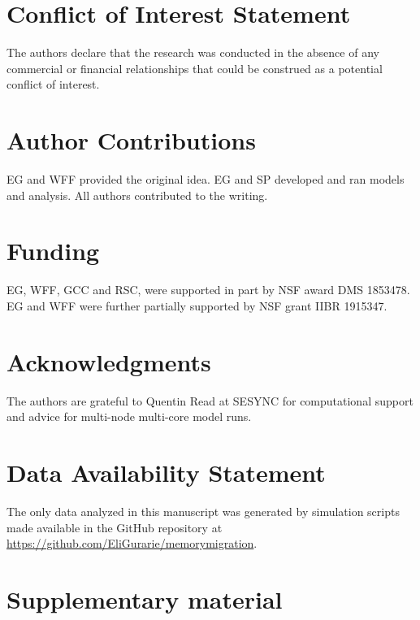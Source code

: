 \documentclass[utf8]{frontiersSCNS} %
\begin{document}
	\section*{Conflict of Interest Statement}
	
	The authors declare that the research was conducted in the absence of any commercial or financial relationships that could be construed as a potential conflict of interest.
	
	\section*{Author Contributions}
	
	EG and WFF provided the original idea. EG and SP developed and ran models and analysis. All authors contributed to the writing. 
	
	\section*{Funding}
	
	EG, WFF, GCC and RSC, were supported in part by NSF award DMS 1853478. EG and WFF were further partially supported by NSF grant IIBR 1915347. 
	
	\section*{Acknowledgments}
	The authors are grateful to Quentin Read at SESYNC for computational support and advice for multi-node multi-core model runs. 
	
	
	\section*{Data Availability Statement}
	
	The only data analyzed in this manuscript was generated by simulation scripts made available in the GitHub repository at \url{https://github.com/EliGurarie/memorymigration}. 
	
	
	
	\clearpage
	\appendix
	
	\section{Supplementary material}
	\normalsize
	
\end{document}
